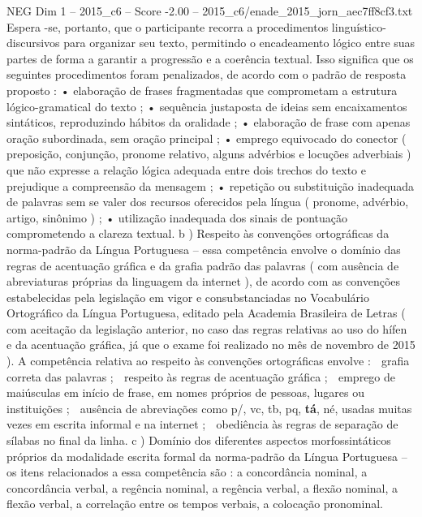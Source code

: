 \begin{textsample}{NEG Dim 1 – 2015\_c6 – Score -2.00 – 2015\_c6/enade\_2015\_jorn\_aec7ff8cf3.txt}
Espera -se, portanto, que o participante recorra a procedimentos linguístico-discursivos para organizar seu texto, permitindo o encadeamento lógico entre suas partes de forma a garantir a progressão e a coerência textual.
Isso significa que os seguintes procedimentos foram penalizados, de acordo com o padrão de resposta proposto : • elaboração de frases fragmentadas que comprometam a estrutura lógico-gramatical do texto ; • sequência justaposta de ideias sem encaixamentos sintáticos, reproduzindo hábitos da oralidade ; • elaboração de frase com apenas oração subordinada, sem oração principal ; • emprego equivocado do conector ( preposição, conjunção, pronome relativo, alguns advérbios e locuções adverbiais ) que não expresse a relação lógica adequada entre dois trechos do texto e prejudique a compreensão da mensagem ; • repetição ou substituição inadequada de palavras sem se valer dos recursos oferecidos pela língua ( pronome, advérbio, artigo, sinônimo ) ; • utilização inadequada dos sinais de pontuação comprometendo a clareza textual. b ) Respeito às convenções ortográficas da norma-padrão da Língua Portuguesa – essa competência envolve o domínio das regras de acentuação gráfica e da grafia padrão das palavras ( com ausência de abreviaturas próprias da linguagem da internet ), de acordo com as convenções estabelecidas pela legislação em vigor e consubstanciadas no Vocabulário Ortográfico da Língua Portuguesa, editado pela Academia Brasileira de Letras ( com aceitação da legislação anterior, no caso das regras relativas ao uso do hífen e da acentuação gráfica, já que o exame foi realizado no mês de novembro de 2015 ).
A competência relativa ao respeito às convenções ortográficas envolve :  grafia correta das palavras ;  respeito às regras de acentuação gráfica ;  emprego de maiúsculas em início de frase, em nomes próprios de pessoas, lugares ou instituições ;  ausência de abreviações como p/, vc, tb, pq, \textbf{tá}, né, usadas muitas vezes em escrita informal e na internet ;  obediência às regras de separação de sílabas no final da linha. c ) Domínio dos diferentes aspectos morfossintáticos próprios da modalidade escrita formal da norma-padrão da Língua Portuguesa – os itens relacionados a essa competência são : a concordância nominal, a concordância verbal, a regência nominal, a regência verbal, a flexão nominal, a flexão verbal, a correlação entre os tempos verbais, a colocação pronominal.

\end{textsample}
